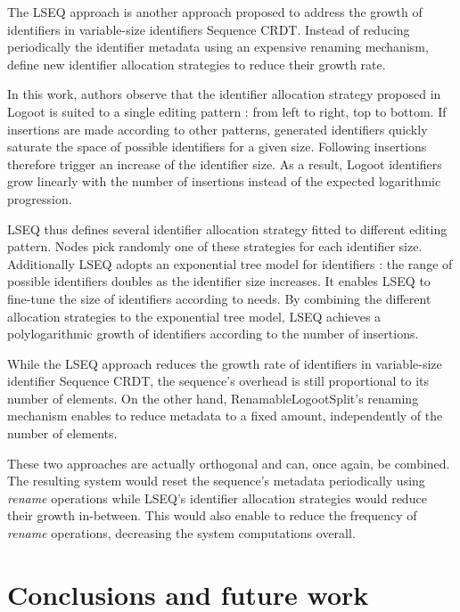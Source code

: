 \documentclass[sigplan,10pt]{acmart}
\begin{document}
The LSEQ approach \cite{nedelec_2013_lseq, doi:10.1002/cpe.4108} is another approach proposed to address the growth of identifiers in variable-size identifiers Sequence \ac{CRDT}. Instead of reducing periodically the identifier metadata using an expensive renaming mechanism, \citeauthor{nedelec_2013_lseq} define new identifier allocation strategies to reduce their growth rate.

In this work, authors observe that the identifier allocation strategy proposed in Logoot\cite{WeissICDCS09} is suited to a single editing pattern : from left to right, top to bottom.
If insertions are made according to other patterns, generated identifiers quickly saturate the space of possible identifiers for a given size.
Following insertions therefore trigger an increase of the identifier size.
As a result, Logoot identifiers grow linearly with the number of insertions instead of the expected logarithmic progression.

LSEQ thus defines several identifier allocation strategy fitted to different editing pattern.
Nodes pick randomly one of these strategies for each identifier size.
Additionally LSEQ adopts an exponential tree model for identifiers : the range of possible identifiers doubles as the identifier size increases.
It enables LSEQ to fine-tune the size of identifiers according to needs.
By combining the different allocation strategies to the exponential tree model, LSEQ achieves a polylogarithmic growth of identifiers according to the number of insertions.

While the LSEQ approach reduces the growth rate of identifiers in variable-size identifier Sequence \ac{CRDT}, the sequence's overhead is still proportional to its number of elements.
On the other hand, RenamableLogootSplit's renaming mechanism enables to reduce metadata to a fixed amount, independently of the number of elements.

These two approaches are actually orthogonal and can, once again, be combined.
The resulting system would reset the sequence's metadata periodically using \emph{rename} operations while LSEQ's identifier allocation strategies would reduce their growth in-between.
This would also enable to reduce the frequency of \emph{rename} operations, decreasing the system computations overall.

\section{Conclusions and future work}
\end{document}
